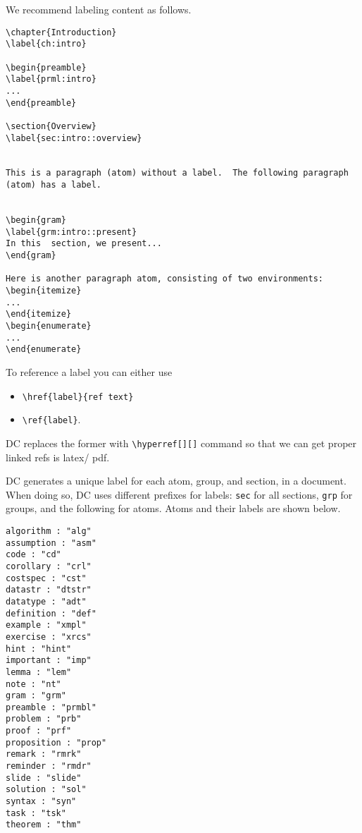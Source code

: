 \begin{example}

We recommend labeling content as follows.

\begin{lstlisting}
\chapter{Introduction}
\label{ch:intro}

\begin{preamble}
\label{prml:intro}
...
\end{preamble}

\section{Overview}
\label{sec:intro::overview}


This is a paragraph (atom) without a label.  The following paragraph (atom) has a label.


\begin{gram}
\label{grm:intro::present}
In this  section, we present...
\end{gram}

Here is another paragraph atom, consisting of two environments:
\begin{itemize}
...
\end{itemize}
\begin{enumerate}
...
\end{enumerate}

\end{lstlisting}
\end{example}

\begin{gram}[References]
To reference a label you can either use
\begin{itemize}
\item \lstinline`\href{label}{ref text}`
\item \lstinline`\ref{label}`.
\end{itemize}
%
DC replaces the former with \lstinline`\hyperref[][]` command so that we can get proper linked refs is latex/ pdf.
\end{gram}

DC generates a unique label for each atom, group, and section, in a document.
%
When doing so, DC uses different prefixes for labels: \lstinline`sec` for all sections, \lstinline`grp` for groups, and the following for atoms.   Atoms and their labels are shown below.
%
\begin{lstlisting}
algorithm : "alg"
assumption : "asm"
code : "cd"
corollary : "crl"
costspec : "cst"
datastr : "dtstr"
datatype : "adt"
definition : "def"
example : "xmpl"
exercise : "xrcs"
hint : "hint"
important : "imp"
lemma : "lem"
note : "nt"
gram : "grm"
preamble : "prmbl"
problem : "prb"
proof : "prf"
proposition : "prop"
remark : "rmrk"
reminder : "rmdr"
slide : "slide"
solution : "sol"
syntax : "syn"
task : "tsk"
theorem : "thm"
\end{lstlisting}

